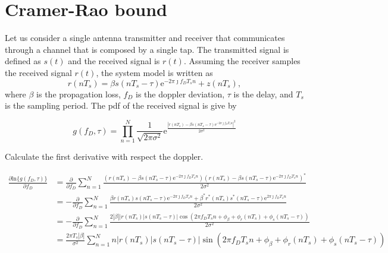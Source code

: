 \documentclass[12pt,a4paper,twoside,english]{article}
\begin{document}
	
\section{Cramer-Rao bound}	
	Let us consider a single antenna transmitter and receiver that communicates through a channel that is composed by a single tap. The transmitted signal is defined as $s(t)$ and the received signal is $r(t)$. Assuming the receiver samples the received signal $r(t)$, the system model is written as
	\begin{equation}
		r(nT_s) = \beta s(nT_s - \tau)\textrm{e}^{-2\pi \jmath f_DT_s n} + z(nT_s),
	\end{equation}
where $\beta$ is the propagation loss, $f_D$ is the doppler deviation, $\tau$ is the delay, and $T_s$ is the sampling period. The pdf of the received signal is give by

\begin{equation}
  g(f_D,\tau) = \prod_{n=1}^{N}\frac{1}{\sqrt{2\pi \sigma ^2}}\textrm{e}^{\frac{|r(nT_s) - \beta s(nT_s - \tau)\textrm{e}^{-2\pi \jmath f_DT_s n}|^2}{2\sigma^2}}
\end{equation}

Calculate the first derivative with respect the doppler.

\begin{align}\label{eq.:first_derivative_doppler}
 \frac{\partial \textrm{ln}\{g(f_D,\tau)\} }{\partial  f_D} & = \frac{\partial }{\partial  f_D} \sum_{n=1}^{N}\frac{\left(r(nT_s) - \beta s(nT_s - \tau)\textrm{e}^{-2\pi \jmath f_DT_s n}\right)\left(r(nT_s) - \beta s(nT_s - \tau)\textrm{e}^{-2\pi \jmath f_DT_s n}\right)^{*}}{2\sigma^2} \nonumber\\
                                                            & =  -\frac{\partial }{\partial  f_D} \sum_{n=1}^{N}\frac{\beta r(nT_s)s(nT_s - \tau)\textrm{e}^{-2\pi \jmath f_DT_s n} + \beta^{*} r^{*}(nT_s)s^{*}(nT_s - \tau)\textrm{e}^{2\pi \jmath f_DT_s n}}{2\sigma^2}  \nonumber\\
                                                            & = -\frac{\partial }{\partial  f_D} \sum_{n=1}^{N} \frac{2|\beta||r(nT_s)|s(nT_s - \tau)|\cos{(2\pi f_DT_s n + \phi_{\beta} + \phi_r(nT_s) + \phi_{s}(nT_s - \tau))}}{2\sigma^2} \nonumber \\
                                                            & = \frac{2\pi T_s |\beta|}{\sigma ^2} \sum_{n=1}^{N} n|r(nT_s)|s(nT_s - \tau)|\sin{(2\pi f_DT_s n + \phi_{\beta} + \phi_r(nT_s) + \phi_{s}(nT_s - \tau))}
\end{align}
\end{document}
